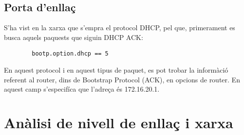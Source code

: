 \documentclass{article}
\begin{document}
\subsection{Porta d'enllaç}
S'ha vist en la xarxa que s'empra el protocol DHCP, pel que, primerament
es busca aquels paquests que siguin DHCP ACK:\\
\begin{lstlisting}
		bootp.option.dhcp == 5
\end{lstlisting}
En aquest protocol i en aquest tipus de paquet, es pot trobar la informàció
referent al router,  dins de Bootstrap Protocol (ACK), en opcions de router.
En aquest camp s'especifíca que l'adreça és 172.16.20.1.
\section{Anàlisi de nivell de enllaç i xarxa}
\end{document}
